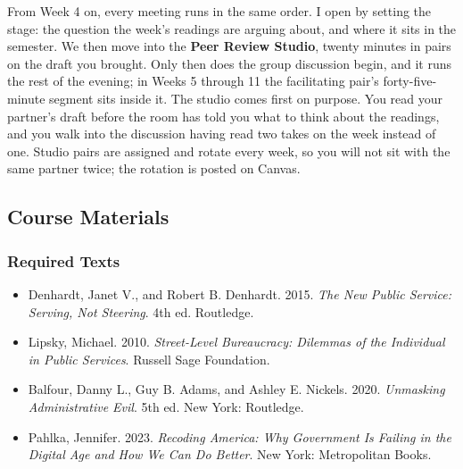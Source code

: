 \documentclass[11pt]{article}     %
\begin{document}
From Week 4 on, every meeting runs in the same order. I open by setting the stage: the question the week's readings are arguing about, and where it sits in the semester. We then move into the \textbf{Peer Review Studio}, twenty minutes in pairs on the draft you brought. Only then does the group discussion begin, and it runs the rest of the evening; in Weeks 5 through 11 the facilitating pair's forty-five-minute segment sits inside it. The studio comes first on purpose. You read your partner's draft before the room has told you what to think about the readings, and you walk into the discussion having read two takes on the week instead of one. Studio pairs are assigned and rotate every week, so you will not sit with the same partner twice; the rotation is posted on Canvas.

\subsection*{Course Materials}
\subsubsection*{Required Texts}
\begin{itemize}
    \item Denhardt, Janet V., and Robert B. Denhardt. 2015. \textit{The New Public Service: Serving, Not Steering}. 4th ed. Routledge.
    \item Lipsky, Michael. 2010. \textit{Street-Level Bureaucracy: Dilemmas of the Individual in Public Services}. Russell Sage Foundation.
    \item Balfour, Danny L., Guy B. Adams, and Ashley E. Nickels. 2020. \textit{Unmasking Administrative Evil}. 5th ed. New York: Routledge.
    \item Pahlka, Jennifer. 2023. \textit{Recoding America: Why Government Is Failing in the Digital Age and How We Can Do Better}. New York: Metropolitan Books.
\end{itemize}
\end{document}

